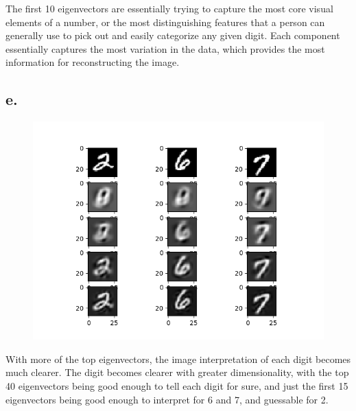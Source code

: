 \documentclass{article}
\newcommand{\1}{\mathbf{1}}
\begin{document}
{The first 10 eigenvectors are essentially trying to capture the most core visual elements of a number, or the most distinguishing features that a person can generally use to pick out and easily categorize any given digit. Each component essentially captures the most variation in the data, which provides the most information for reconstructing the image.

\subsection*{e.}


\begin{figure}[!hb]
  \centering
  \includegraphics[width=130mm]{../hw4-code/results/a3_e.png}
\end{figure}

With more of the top eigenvectors, the image interpretation of each digit becomes much clearer. The digit becomes clearer with greater dimensionality, with the top 40 eigenvectors being good enough to tell each digit for sure, and just the first 15 eigenvectors being good enough to interpret for 6 and 7, and guessable for 2.

}
\end{document}
